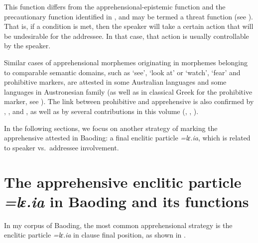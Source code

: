 \documentclass[output=paper,colorlinks,citecolor=brown, language=chinese]{langscibook}
\begin{document}
This function differs from the apprehensional-epistemic function and the precautionary function identified in \citet{lichtenberk1995}, and may be termed a threat function (see \cite[273]{vuillermet2018a}). That is, if a condition is met, then the speaker will take a certain action that will be undesirable for the addressee. In that case, that action is usually controllable by the speaker.

Similar cases of apprehensional morphemes originating in morphemes belonging to comparable semantic domains, such as `see', `look at' or `watch', `fear' and prohibitive markers, are attested in some Australian languages and some languages in Austronesian family (as well as in classical Greek for the prohibitive marker, see \cite{lichtenberk1995}). The link between prohibitive and apprehensive is also confirmed by \citet[50--63]{Dobrushina2006}, \citet{pakendorfschalley2007}, and \citet{smithdennis2021}, as well as by several contributions in this volume (\citeauthor{chapters/lahaussois}, \citeauthor{chapters/treis}, \citeauthor{chapters/wiemer}).

In the following sections, we focus on another strategy of marking the apprehensive attested in Baoding: a final enclitic particle \textit{=lɛ.ia}, which is related to speaker vs.\ addressee involvement.




\section{The apprehensive enclitic particle \textit{=lɛ.ia} in Baoding and its functions}
\label{sec:leia}

In my corpus of Baoding, the most common apprehensional strategy is the enclitic particle \textit{=lɛ.ia} in clause final position, as shown in .
\end{document}

